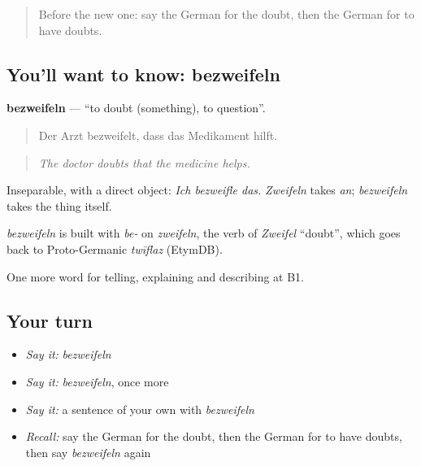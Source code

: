 \label{lesson:GE-C337-bezweifeln}



\begin{quote}
Before the new one: say the German for the doubt, then the German for to have doubts.
\end{quote}

\subsection*{You'll want to know: bezweifeln}
\textbf{bezweifeln} — \textquotedblleft{}to doubt (something), to question\textquotedblright{}.

\begin{quote}
Der Arzt bezweifelt, dass das Medikament hilft.
\end{quote}

\begin{quote}
\emph{The doctor doubts that the medicine helps.}
\end{quote}

Inseparable, with a direct object: \emph{Ich bezweifle das.} \emph{Zweifeln} takes \emph{an}; \emph{bezweifeln} takes the thing itself.

\begin{cousinweb}
\emph{bezweifeln} is built with \emph{be-} on \emph{zweifeln}, the verb of \emph{Zweifel} \textquotedblleft{}doubt\textquotedblright{}, which goes back to Proto-Germanic \emph{twīflaz} (EtymDB).
\end{cousinweb}

\begin{grammarlens}[title={What you've built}]
One more word for telling, explaining and describing at B1.
\end{grammarlens}

\subsection*{Your turn}
\begin{itemize}
\raggedright
  \item \emph{Say it:} \emph{bezweifeln}
  \item \emph{Say it:} \emph{bezweifeln}, once more
  \item \emph{Say it:} a sentence of your own with \emph{bezweifeln}
  \item \emph{Recall:} say the German for the doubt, then the German for to have doubts, then say \emph{bezweifeln} again
\end{itemize}

